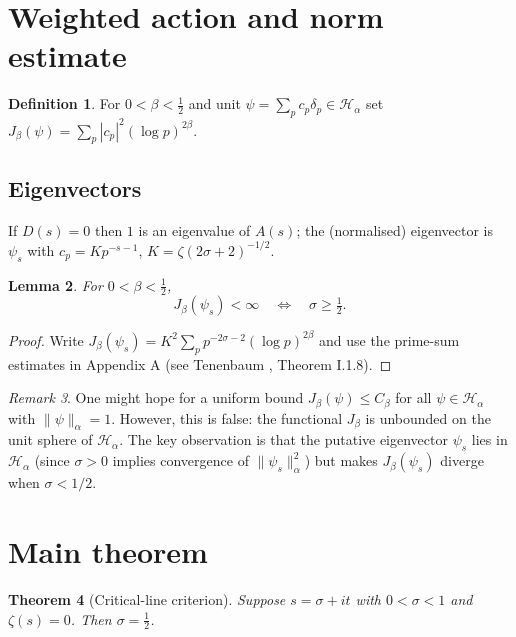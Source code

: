 \documentclass[12pt]{article}
\newtheorem{theorem}{Theorem}[section]
\newtheorem{lemma}[theorem]{Lemma}
\theoremstyle{definition}
\newtheorem{definition}[theorem]{Definition}
\theoremstyle{remark}
\newtheorem{remark}[theorem]{Remark}
\newcommand{\Hspace}{\mathcal H}
\newcommand{\Zeta}{\zeta}
\begin{document}
\section{Weighted action and norm estimate}

\begin{definition}
For \(0<\beta<\tfrac12\) and unit \(\psi=\sum_{p}c_p\delta_p\in\Hspace_{\alpha}\)
set \(J_\beta(\psi)=\sum_{p}|c_p|^{2}(\log p)^{2\beta}\).
\end{definition}

\subsection*{Eigenvectors}
If \(D(s)=0\) then \(1\) is an eigenvalue of \(A(s)\); the (normalised)
eigenvector is \(\psi_s\) with
\(c_p = K p^{-s-1}\),
\(K=\Zeta(2\sigma+2)^{-1/2}\).

\begin{lemma}\label{lem:div}
For \(0<\beta<\tfrac12\),
\[
  J_\beta(\psi_s)<\infty\quad\Longleftrightarrow\quad \sigma\ge\tfrac12.
\]
\end{lemma}

\begin{proof}
Write \(J_\beta(\psi_s)=K^{2}\sum_{p}p^{-2\sigma-2}(\log p)^{2\beta}\)
and use the prime-sum estimates in Appendix A
(see Tenenbaum \cite{tenenbaum}, Theorem I.1.8).
\end{proof}



\begin{remark}\label{rem:no-uniform}
One might hope for a uniform bound \(J_\beta(\psi) \le C_\beta\) for all
\(\psi \in \Hspace_{\alpha}\) with \(\|\psi\|_{\alpha} = 1\). However, this is false:
the functional \(J_\beta\) is unbounded on the unit sphere of \(\Hspace_{\alpha}\).
The key observation is that the putative eigenvector \(\psi_s\) lies in
\(\Hspace_{\alpha}\) (since \(\sigma > 0\) implies convergence of \(\|\psi_s\|_{\alpha}^2\))
but makes \(J_\beta(\psi_s)\) diverge when \(\sigma < 1/2\).
\end{remark}

\section{Main theorem}

\begin{theorem}[Critical-line criterion]\label{thm:main}
Suppose \(s=\sigma+it\) with \(0<\sigma<1\) and \(\Zeta(s)=0\).
Then \(\sigma=\tfrac12\).
\end{theorem}
\end{document}
